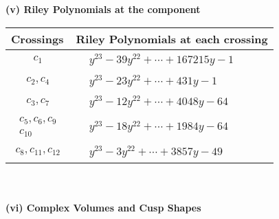 \documentclass[1p]{elsarticle_modified}
\theoremstyle{definition}
\begin{document}
\newpage\renewcommand{\arraystretch}{1}
\flushleft \textbf{(v) Riley Polynomials at the component}\newline \\
\begin{tabular}{m{50pt}|m{274pt}}
Crossings & \hspace{64pt}Riley Polynomials at each crossing \\
\hline $$\begin{aligned}c_{1}\end{aligned}$$&$\begin{aligned}
&y^{23}-39 y^{22}+\cdots+167215 y-1
\end{aligned}$\\
\hline $$\begin{aligned}c_{2},c_{4}\end{aligned}$$&$\begin{aligned}
&y^{23}-23 y^{22}+\cdots+431 y-1
\end{aligned}$\\
\hline $$\begin{aligned}c_{3},c_{7}\end{aligned}$$&$\begin{aligned}
&y^{23}-12 y^{22}+\cdots+4048 y-64
\end{aligned}$\\
\hline $$\begin{aligned}c_{5},c_{6},c_{9}\\c_{10}\end{aligned}$$&$\begin{aligned}
&y^{23}-18 y^{22}+\cdots+1984 y-64
\end{aligned}$\\
\hline $$\begin{aligned}c_{8},c_{11},c_{12}\end{aligned}$$&$\begin{aligned}
&y^{23}-3 y^{22}+\cdots+3857 y-49
\end{aligned}$\\
\hline
\end{tabular}\\~\\
\newpage\flushleft \textbf{(vi) Complex Volumes and Cusp Shapes}
\end{document}
